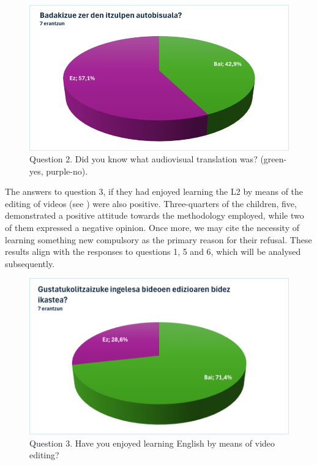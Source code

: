 \begin{figure}[htbp]
    \centering
    \begin{minipage}{.5\textwidth}
    \includegraphics[width=\textwidth]{fig02.png}
    \caption{Question 2. Did you know what audiovisual translation
    was? (green-yes, purple-no).}
    \label{fig-02}
    \end{minipage}
\end{figure}

The answers to question 3, if they had enjoyed learning the L2 by means
of the editing of videos (see ) were also positive.
Three-quarters of the children, five, demonstrated a positive attitude
towards the methodology employed, while two of them expressed a negative
opinion. Once more, we may cite the necessity of learning something new
compulsory as the primary reason for their refusal. These results align
with the responses to questions 1, 5 and 6, which will be analysed
subsequently.

\begin{figure}[htbp]
    \centering
    \begin{minipage}{.5\textwidth}
    \includegraphics[width=\textwidth]{fig03.png}
    \caption{Question 3. Have you enjoyed learning English by
    means of video editing?}
    \label{fig-03}
    \end{minipage}
\end{figure}

